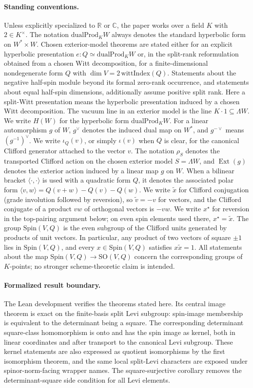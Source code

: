 \documentclass{birkjour}
\theoremstyle{plain}
\theoremstyle{definition}
\theoremstyle{remark}
\newcommand{\Spin}{\mathrm{Spin}}
\newcommand{\SO}{\mathrm{SO}}
\newcommand{\dualProd}{\mathrm{dualProd}}
\newcommand{\ExtMap}{\operatorname{Ext}}
\newcommand{\wedgeW}{\Lambda W}
\begin{document}
\paragraph{Standing conventions.}
Unless explicitly specialized to $\mathbb{R}$ or $\mathbb{C}$, the paper works
over a field $K$ with $2\in K^\times$. The notation $\dualProd_K W$ always
denotes the standard hyperbolic form on $W^* \times W$. Chosen exterior-model theorems
are stated either for an explicit hyperbolic presentation
$e:Q \simeq \dualProd_K W$ or, in the split-rank reformulation obtained from a
chosen Witt decomposition, for a
finite-dimensional nondegenerate form $Q$ with
$\dim V = 2\,\mathrm{wittIndex}(Q)$. Statements about the negative half-spin
module beyond its formal zero-rank occurrence, and statements about equal
half-spin dimensions, additionally assume positive split rank.
Here a split-Witt presentation means the hyperbolic presentation induced by a
chosen Witt decomposition. The vacuum line in an exterior model is the line
$K\cdot 1\subseteq \wedgeW$.
We write $H(W)$ for the hyperbolic form $\dualProd_K W$. For a linear
automorphism $g$ of $W$, $g^\vee$ denotes the induced dual map on $W^*$, and
$g^{-\vee}$ means $(g^{-1})^\vee$. We write $\iota_Q(v)$, or simply
$\iota(v)$ when $Q$ is clear, for the canonical Clifford generator attached to
the vector $v$. The notation $\rho_S$ denotes the transported Clifford action
on the chosen exterior model $S=\wedgeW$, and $\ExtMap(g)$ denotes the
exterior action induced by a linear map $g$ on $W$.
When a bilinear bracket $\langle\cdot,\cdot\rangle$ is used with a quadratic
form $Q$, it denotes the associated polar form
$\langle v,w\rangle=Q(v+w)-Q(v)-Q(w)$.
We write $\tilde x$ for Clifford conjugation (grade involution followed by
reversion), so $\tilde v=-v$ for vectors, and the Clifford conjugate of a
product \(vw\) of orthogonal vectors is \(-vw\). We write $x^\star$ for reversion in the top-pairing
argument below; on even spin elements used there, $x^\star=\tilde x$. The group
$\Spin(V,Q)$ is the even subgroup of the Clifford units generated by products of
unit vectors. In particular, any product of two vectors of square $\pm1$ lies in
$\Spin(V,Q)$, and every $x\in \Spin(V,Q)$ satisfies $x\tilde x=1$.
All statements about the map $\Spin(V,Q)\to\SO(V,Q)$ concern the corresponding
groups of $K$-points; no stronger scheme-theoretic claim is intended.

\paragraph{Formalized result boundary.}
The Lean development verifies the theorems stated here. Its central image
theorem is exact on the finite-basis split Levi subgroup: spin-image membership
is equivalent to the determinant being a square. The corresponding determinant
square-class homomorphism is onto and has the spin image as kernel, both in
linear coordinates and after transport to the canonical Levi subgroup. These
kernel statements are also expressed as quotient isomorphisms by the first
isomorphism theorem, and the same local split-Levi characters are exposed under
spinor-norm-facing wrapper names. The square-surjective corollary removes the
determinant-square side condition for all Levi elements.
\end{document}
